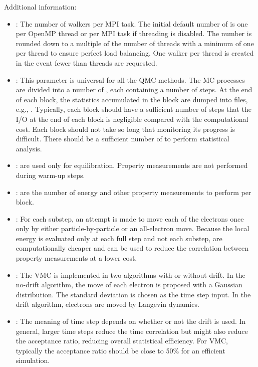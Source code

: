 Additional information:
\begin{itemize}
\item {}: The number of walkers per MPI task. The initial default number of  is one per OpenMP thread or per MPI task if threading is disabled. The number is rounded down to a multiple of the number of threads with a minimum of one per thread to ensure perfect load balancing. One walker per thread is created in the event fewer  than threads are requested. 

\item {}: This parameter is universal for all the QMC
  methods. The MC processes are divided into a number of
  , each containing a number of steps. At the end of each block,
  the statistics accumulated in the block are dumped into files,
  e.g., . Typically, each block should have a sufficient number of steps that the I/O at the end of each block is negligible
  compared with the computational cost. Each block should not take so
  long that monitoring its progress is difficult. There should be a
  sufficient number of  to perform statistical analysis.

\item {}:  are used only for
  equilibration. Property measurements are not performed during
  warm-up steps.

\item {}:  are the number of energy and other property measurements to perform per block.
  
\item {}: For each substep, an attempt is made to move each of the electrons once only by either particle-by-particle or an
  all-electron move.  Because the local energy is evaluated only at
  each full step and not each substep,  are computationally cheaper
  and can be used to reduce the correlation between property measurements
  at a lower cost.
  
\item {}: The VMC is implemented in two algorithms with
  or without drift. In the no-drift algorithm, the move of each
  electron is proposed with a Gaussian distribution. The standard
  deviation is chosen as the time step input. In the drift algorithm,
  electrons are moved by Langevin dynamics.

\item {}: The meaning of time step depends on whether or not
  the drift is used. In general, larger time steps reduce the
  time correlation but might also reduce the acceptance ratio,
  reducing overall statistical efficiency. For VMC, typically the
  acceptance ratio should be close to 50\% for an efficient
  simulation.


\end{itemize}

